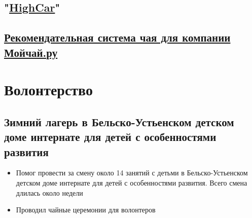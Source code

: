 \documentclass[11pt]{article}
\begin{document}
\subsection{"\href{https://docs.google.com/presentation/d/1AiwyzLKDgDXIaclUwoyGgT-VDJMtJYJQqAMVfbNlB40/edit\#slide=id.p1}{HighCar}"}
\label{sec:org01a599a}
\subsection{\href{https://docs.google.com/presentation/d/1yi3B47CxyzGHnKza1snK03tzrlmESLaszM7MK1unRtk/edit\#slide=id.p}{Рекомендательная система чая для компании Мойчай.ру}}
\label{sec:orga06f7ec}
\section{Волонтерство}
\label{sec:org789d919}
\subsection{Зимний лагерь в Бельско-Устьенском детском доме интернате для детей с особенностями развития}
\label{sec:orgc18491a}
\begin{itemize}
\item Помог провести за смену около 14 занятий с детьми в Бельско-Устьенском детском доме интернате для детей с особенностями развития. Всего смена длилась около недели
\item Проводил чайные церемонии для волонтеров
\end{itemize}
\end{document}
